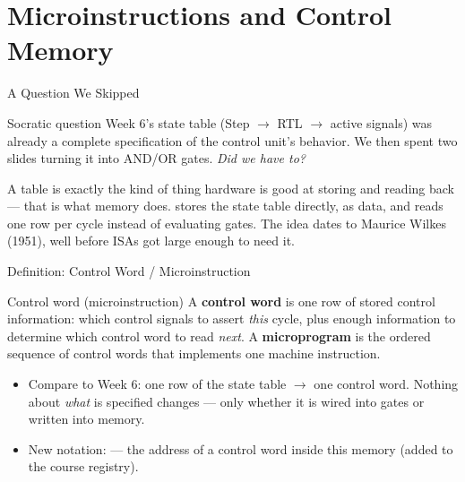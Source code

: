 \documentclass[aspectratio=169]{beamer}
\begin{document}

\section{Microinstructions and Control Memory}

\begin{frame}{A Question We Skipped}
  \begin{block}{Socratic question}
    Week 6's state table (Step $\to$ RTL $\to$ active signals) was already a
    complete specification of the control unit's behavior. We then spent two
    slides turning it into AND/OR gates. \emph{Did we have to?}
  \end{block}
  A table is exactly the kind of thing hardware is good at storing and
  reading back --- that is what memory does. 
  stores the state table directly, as data, and reads one row per cycle
  instead of evaluating gates. The idea dates to Maurice Wilkes (1951), well
  before ISAs got large enough to need it.
\end{frame}

\begin{frame}{Definition: Control Word / Microinstruction}
  \begin{block}{Control word (microinstruction)}
    A \textbf{control word} is one row of stored control information: which
    control signals to assert \emph{this} cycle, plus enough information to
    determine which control word to read \emph{next}. A \textbf{microprogram}
    is the ordered sequence of control words that implements one machine
    instruction.
  \end{block}
  \begin{itemize}
    \item Compare to Week 6: one row of the state table $\to$ one control
      word. Nothing about \emph{what} is specified changes --- only whether it
      is wired into gates or written into memory.
    \item New notation:  --- the address of a control word
      inside this memory (added to the course registry).
  \end{itemize}
\end{frame}
\end{document}
